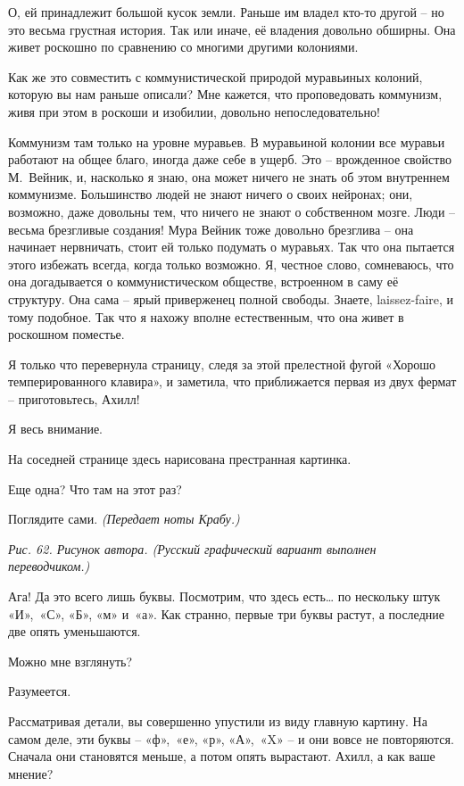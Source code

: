 \documentclass[../main.tex]{subfiles}
\begin{document}
\begin{dialogue}
 О, ей принадлежит большой кусок земли. Раньше им владел кто-то другой \--- но это весьма грустная история. Так или иначе, её владения довольно обширны. Она живет роскошно по сравнению со многими другими колониями.

 Как же это совместить с коммунистической природой муравьиных колоний, которую вы нам раньше описали? Мне кажется, что проповедовать коммунизм, живя при этом в роскоши и изобилии, довольно непоследовательно!

 Коммунизм там только на уровне муравьев. В муравьиной колонии все муравьи работают на общее благо, иногда даже себе в ущерб. Это \--- врожденное свойство М.~Вейник, и, насколько я знаю, она может ничего не знать об этом внутреннем коммунизме. Большинство людей не знают ничего о своих нейронах; они, возможно, даже довольны тем, что ничего не знают о собственном мозге. Люди \--- весьма брезгливые создания! Мура Вейник тоже довольно брезглива \--- она начинает нервничать, стоит ей только подумать о муравьях. Так что она пытается этого избежать всегда, когда только возможно. Я, честное слово, сомневаюсь, что она догадывается о коммунистическом обществе, встроенном в саму её структуру. Она сама \--- ярый приверженец полной свободы. Знаете, laissez-faire, и тому подобное. Так что я нахожу вполне естественным, что она живет в роскошном поместье.

 Я только что перевернула страницу, следя за этой прелестной фугой «Хорошо темперированного клавира», и заметила, что приближается первая из двух фермат \--- приготовьтесь, Ахилл!

 Я весь внимание.

 На соседней странице здесь нарисована престранная картинка.

 Еще одна? Что там на этот раз?

 Поглядите сами. \emph{(Передает ноты Крабу.)}

\emph{Рис. 62. Рисунок автора. (Русский графический вариант выполнен переводчиком.)}

 Ага! Да это всего лишь буквы. Посмотрим, что здесь есть\ldots{} по нескольку штук «И»,~«С», «Б», «м» и~«а». Как странно, первые три буквы растут, а последние две опять уменьшаются.

 Можно мне взглянуть?

 Разумеется.

 Рассматривая детали, вы совершенно упустили из виду главную картину. На самом деле, эти буквы \--- «ф»,~«е», «р», «А»,~«X» \--- и они вовсе не повторяются. Сначала они становятся меньше, а потом опять вырастают. Ахилл, а как ваше мнение?


\end{dialogue}
\end{document}
